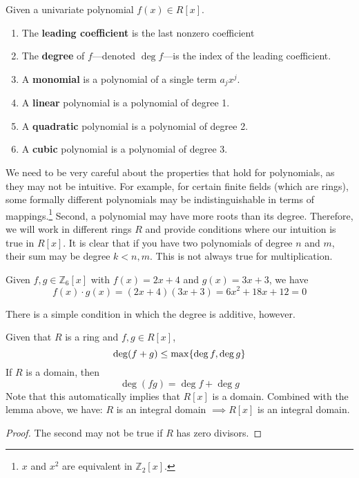   \begin{definition}
    Given a univariate polynomial $f(x) \in R[x]$. 
    \begin{enumerate} 
      \item The \textbf{leading coefficient} is the last nonzero coefficient  
      \item The \textbf{degree} of $f$---denoted $\deg f$---is the index of the leading coefficient.
      \item A \textbf{monomial} is a polynomial of a single term $a_j x^j$. 
      \item A \textbf{linear} polynomial is a polynomial of degree 1. 
      \item A \textbf{quadratic} polynomial is a polynomial of degree 2. 
      \item A \textbf{cubic} polynomial is a polynomial of degree 3. 
    \end{enumerate}
  \end{definition}

  We need to be very careful about the properties that hold for polynomials, as they may not be intuitive. For example, for certain finite fields (which are rings), some formally different polynomials may be indistinguishable in terms of mappings.\footnote{$x$ and $x^2$ are equivalent in  $\mathbb{Z}_2 [x]$. } Second, a polynomial may have more roots than its degree. Therefore, we will work in different rings $R$ and provide conditions where our intuition is true in $R[x]$. It is clear that if you have two polynomials of degree $n$ and $m$, their sum may be degree $k < n, m$. This is not always true for multiplication. 

  \begin{example}
    Given $f, g \in \mathbb{Z}_6 [x]$ with $f(x) = 2x + 4$ and $g(x) = 3x + 3$, we have 
    \begin{equation}
      f(x) \cdot g(x) = (2x + 4)(3x + 3) = 6x^2 + 18 x + 12 = 0
    \end{equation}
  \end{example}

  There is a simple condition in which the degree is additive, however. 

  \begin{theorem}
    Given that $R$ is a ring and $f, g \in R[x]$, 
    \begin{equation}
      \deg(f+g) \leq \max\{\deg f, \deg g\} \\
    \end{equation}
    If $R$ is a domain, then 
    \begin{equation}
      \deg (f g) = \deg f + \deg g
    \end{equation}
    Note that this automatically implies that $R[x]$ is a domain. Combined with the lemma above, we have: $R$ is an integral domain $\implies R[x]$ is an integral domain. 
  \end{theorem}
  \begin{proof}
    The second may not be true if $R$ has zero divisors. 
  \end{proof}

